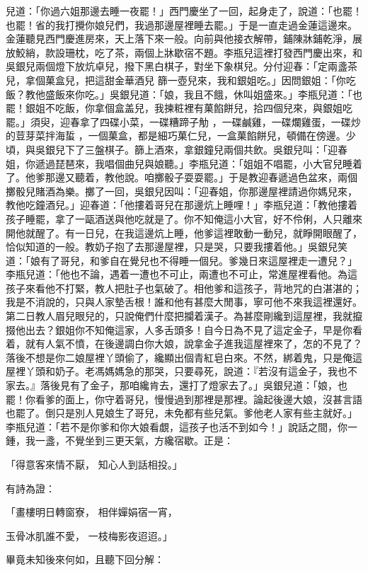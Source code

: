 兒道：「你過六姐那邊去睡一夜罷！」西門慶坐了一回，起身走了，說道：「也罷！也罷！省的我打攪你娘兒們，我過那邊屋裡睡去罷。」于是一直走過金蓮這邊來。金蓮聽見西門慶進房來，天上落下來一般。向前與他接衣解帶，鋪陳牀鋪乾淨，展放鮫綃，款設珊枕，吃了茶，兩個上牀歇宿不題。李瓶兒這裡打發西門慶出來，和吳銀兒兩個燈下放炕卓兒，撥下黑白棋子，對坐下象棋兒。分付迎春：「定兩盞茶兒，拿個菓盒兒，把這甜金華酒兒 篩一壺兒來，我和銀姐吃。」因問銀姐：「你吃飯？教他盛飯來你吃。」吳銀兒道：「娘，我且不餓，休叫姐盛來。」李瓶兒道：「也罷！銀姐不吃飯，你拿個盒盖兒，我揀粧裡有菓餡餅兒，拾四個兒來，與銀姐吃罷。」須臾，迎春拿了四碟小菜，一碟糟蹄子觔 ，一碟鹹雞，一碟爛雞蛋，一碟炒的荳芽菜拌海蜇 ，一個菓盒，都是細巧菓仁兒，一盒菓餡餅兒，頓備在傍邊。少頃，與吳銀兒下了三盤棋子。篩上酒來，拿銀鐘兒兩個共飲。吳銀兒叫：「迎春姐，你遞過琵琶來，我唱個曲兒與娘聽。」李瓶兒道：「姐姐不唱罷，小大官兒睡着了。他爹那邊又聽着，教他說。咱擲骰子耍耍罷。」于是教迎春遞過色盆來，兩個擲骰兒賭酒為樂。擲了一回，吳銀兒因叫：「迎春姐，你那邊屋裡請過你媽兒來，教他吃鐘酒兒。」迎春道：「他摟着哥兒在那邊炕上睡哩！」李瓶兒道：「教他摟着孩子睡罷，拿了一甌酒送與他吃就是了。你不知俺這小大官，好不伶俐，人只離來開他就醒了。有一日兒，在我這邊炕上睡，他爹這裡敢動一動兒，就睜開眼醒了，恰似知道的一般。教奶子抱了去那邊屋裡，只是哭，只要我摟着他。」吳銀兒笑道：「娘有了哥兒，和爹自在覺兒也不得睡一個兒。爹幾日來這屋裡走一遭兒？」李瓶兒道：「他也不論，遇着一遭也不可止，兩遭也不可止，常進屋裡看他。為這孩子來看他不打緊，教人把肚子也氣破了。相他爹和這孩子，背地咒的白湛湛的；我是不消說的，只與人家墊舌根！誰和他有甚麼大閒事，寧可他不來我這裡還好。第二日教人眉兒眼兒的，只說俺們什麼把攔着漢子。為甚麼剛纔到這屋裡，我就攛掇他出去？銀姐你不知俺這家，人多舌頭多！自今日為不見了這定金子，早是你看着，就有人氣不憤，在後邊調白你大娘，說拿金子進我這屋裡來了，怎的不見了？落後不想是你二娘屋裡丫頭偷了，纔顯出個青紅皂白來。不然，綁着鬼，只是俺這屋裡丫頭和奶子。老馮媽媽急的那哭，只要尋死，說道：『若沒有這金子，我也不家去。』落後見有了金子，那咱纔肯去，還打了燈家去了。」吳銀兒道：「娘，也罷！你看爹的面上，你守着哥兒，慢慢過到那裡是那裡。論起後邊大娘，沒甚言語也罷了。倒只是別人見娘生了哥兒，未免都有些兒氣。爹他老人家有些主就好。」李瓶兒道：「若不是你爹和你大娘看覷，這孩子也活不到如今！」說話之間，你一鍾，我一盞，不覺坐到三更天氣，方纔宿歇。正是：

「得意客來情不厭，  知心人到話相投。」

有詩為證：

「畫樓明日轉窗寮，  相伴嬋娟宿一宵，

玉骨冰肌誰不愛，  一枝梅影夜迢迢。」

畢竟未知後來何如，且聽下回分解：
